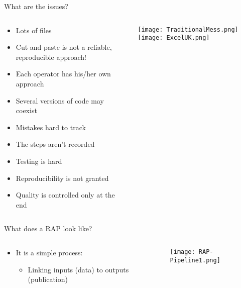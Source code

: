 \documentclass[xcolor=x11names,compress]{beamer}
\renewcommand{\(}{\begin{columns}}
\renewcommand{\)}{\end{columns}}
\newcommand{\<}[1]{\begin{column}{#1}}
\renewcommand{\>}{\end{column}}
\begin{document}
\begin{frame}{What are the issues?}
  \begin{columns}[T]
    \begin{column}{0.5\textwidth}
      \begin{itemize}
        \item Lots of files
        \item Cut and paste is not a reliable, reproducible approach!
        \item Each operator has his/her own approach
        \item Several versions of code may coexist
        \item Mistakes hard to track
        \item The steps aren't recorded
        \item Testing is hard
        \item Reproducibility is not granted
        \item Quality is controlled only at the end
      \end{itemize}
    \end{column}
    \begin{column}{0.5\textwidth}
      \texttt{[image: TraditionalMess.png]}
      \texttt{[image: ExcelUK.png]}
    \end{column}
  \end{columns}
\end{frame}


\begin{frame}{What does a RAP look like?}
  \begin{columns}[T]
    \begin{column}{0.6\textwidth}
      \begin{itemize}
        \item It is a simple process:
          \begin{itemize}
            \item Linking inputs (data) to outputs (publication)
          \end{itemize}
      \end{itemize}
    \end{column}
    \begin{column}{0.4\textwidth}
      \texttt{[image: RAP-Pipeline1.png]}
    \end{column}
  \end{columns}
\end{frame}
\end{document}

